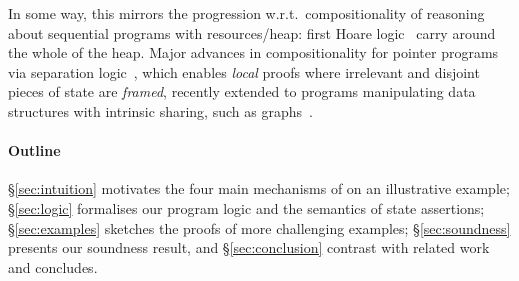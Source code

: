 
In some way, this mirrors the progression w.r.t.\ compositionality of
reasoning about sequential programs with resources/heap: first Hoare
logic~\cite{hoarelogic} carry around the whole of the heap. Major
advances in compositionality for pointer programs via separation
logic~\cite{seplog}, which enables \emph{local} proofs where
irrelevant and disjoint pieces of state are \emph{framed}, recently
extended to programs manipulating data structures with intrinsic
sharing, such as graphs~\cite{ramification}.


\paragraph{Outline}
\S\ref{sec:intuition} motivates the four main mechanisms of \colosl on
an illustrative example; \S\ref{sec:logic} formalises our program
logic and the semantics of state assertions; \S\ref{sec:examples}
sketches the proofs of more challenging examples;
\S\ref{sec:soundness} presents our soundness result, and
\S\ref{sec:conclusion} contrast with related work and concludes.
